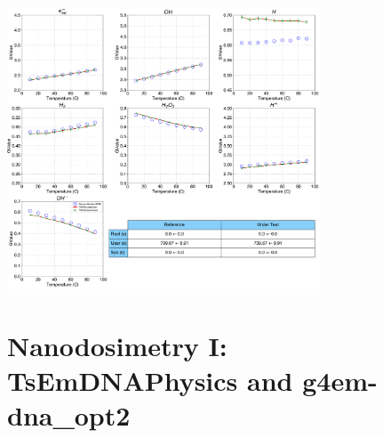 \documentclass[aspectratio=1610]{beamer}
\begin{document}
\begin{frame}{\secname}
 \centering
  \includegraphics[width=0.7\textwidth]{./GvalueIRT-Temperature/TemperatureEvolution}
\end{frame}

\section{Nanodosimetry I: TsEmDNAPhysics and g4em-dna\_opt2}
\end{document}
